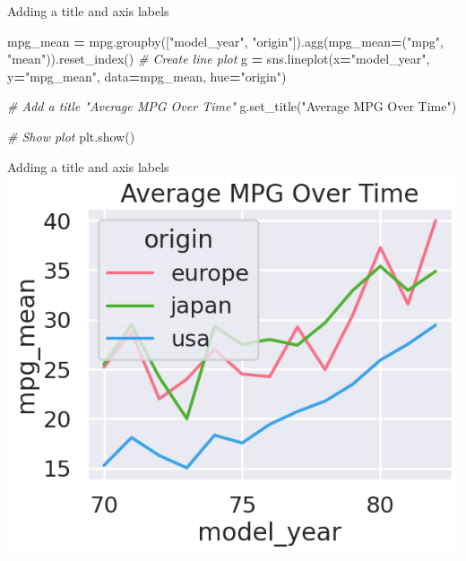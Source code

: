 \documentclass[
  ignorenonframetext,
]{beamer}
\newenvironment{Shaded}{\begin{snugshade}}{\end{snugshade}}
\newcommand{\CommentTok}[1]{\textcolor[rgb]{0.56,0.35,0.01}{\textit{#1}}}
\newcommand{\NormalTok}[1]{#1}
\newcommand{\OperatorTok}[1]{\textcolor[rgb]{0.81,0.36,0.00}{\textbf{#1}}}
\newcommand{\StringTok}[1]{\textcolor[rgb]{0.31,0.60,0.02}{#1}}
\begin{document}
\begin{frame}[fragile]{Adding a title and axis labels}
\label{adding-a-title-and-axis-labels-3}

\begin{Shaded}
\begin{Highlighting}[]
\NormalTok{mpg\_mean }\OperatorTok{=}\NormalTok{ mpg.groupby([}\StringTok{"model\_year"}\NormalTok{, }\StringTok{"origin"}\NormalTok{]).agg(mpg\_mean}\OperatorTok{=}\NormalTok{(}\StringTok{"mpg"}\NormalTok{, }\StringTok{"mean"}\NormalTok{)).reset\_index()}
\CommentTok{\# Create line plot}
\NormalTok{g }\OperatorTok{=}\NormalTok{ sns.lineplot(x}\OperatorTok{=}\StringTok{"model\_year"}\NormalTok{, y}\OperatorTok{=}\StringTok{"mpg\_mean"}\NormalTok{, }
\NormalTok{                 data}\OperatorTok{=}\NormalTok{mpg\_mean,}
\NormalTok{                 hue}\OperatorTok{=}\StringTok{"origin"}\NormalTok{)}

\CommentTok{\# Add a title "Average MPG Over Time"}
\NormalTok{g.set\_title(}\StringTok{"Average MPG Over Time"}\NormalTok{)}

\CommentTok{\# Show plot}
\NormalTok{plt.show()}
\end{Highlighting}
\end{Shaded}
\end{frame}

\begin{frame}{Adding a title and axis labels}
\label{adding-a-title-and-axis-labels-4}
\includegraphics{../images/im306.png}
\end{frame}
\end{document}
